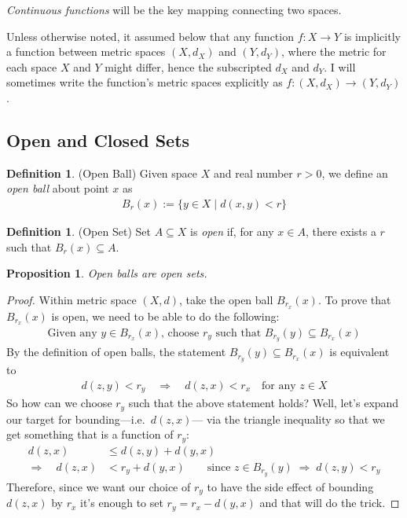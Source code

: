 \documentclass[12pt]{book}
\numberwithin{equation}{section} %
\theoremstyle{plain}
\newtheorem{prop}[thm]{Proposition}
\theoremstyle{definition}
\newtheorem{defn}[thm]{Definition}
\theoremstyle{remark}
\begin{document}
\emph{Continuous functions} will be the key mapping connecting two
spaces.

Unless otherwise noted, it assumed below that any function
$f:X\rightarrow Y$ is implicitly a function between metric spaces
$(X,d_X)$ and $(Y,d_Y)$, where the metric for each space $X$ and $Y$
might differ, hence the subscripted $d_X$ and $d_Y$.
I will sometimes write the function's metric spaces explicitly as
$f:(X,d_X)\rightarrow(Y,d_Y)$.


\subsection{Open and Closed Sets}

\begin{defn}{(Open Ball)}
Given space $X$ and real number $r>0$, we define an \emph{open ball}
about point $x$ as
\begin{align*}
  B_r(x) := \{ y \in X \;|\; d(x,y)<r\}
\end{align*}
\end{defn}

\begin{defn}{(Open Set)}
Set $A\subseteq X$ is \emph{open} if, for any $x\in A$, there exists a
$r$ such that $B_r(x)\subseteq A$.
\end{defn}

\begin{prop}
Open balls are open sets.
\end{prop}
\begin{proof}
Within metric space $(X,d)$, take the open ball $B_{r_x}(x)$.  To prove
that $B_{r_x}(x)$ is open, we need to be able to do the following:
\begin{align*}
  \text{Given any $y\in B_{r_x}(x)$, choose $r_y$ such that $B_{r_y}(y)\subseteq B_{r_x}(x)$}
\end{align*}
By the definition of open balls, the statement $B_{r_y}(y)\subseteq
B_{r_x}(x)$ is equivalent to
\begin{align*}
  d(z,y) < r_y \quad\Rightarrow\quad
  d(z,x) < r_x
  \quad\text{for any $z\in X$}
\end{align*}
So how can we choose $r_y$ such that the above statement holds?
Well, let's expand our target for bounding---i.e.\ $d(z,x)$--- via the
triangle inequality so that we get something that is a function of
$r_y$:
\begin{align*}
  d(z,x) &\leq d(z,y) + d(y,x)\\
  \Rightarrow \quad
  d(z,x) &< r_y + d(y,x) \qquad
  \text{since $z\in B_{r_y}(y) \; \Rightarrow\; d(z,y)<r_y$}
\end{align*}
Therefore, since we want our choice of $r_y$ to have the side effect of
bounding $d(z,x)$ by $r_x$ it's enough to set $r_y = r_x - d(y,x)$ and
that will do the trick.
\end{proof}
\end{document}
